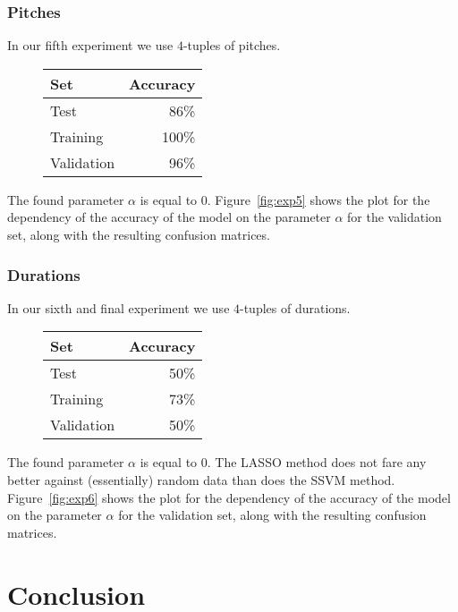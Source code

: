 \documentclass[twocolumn,dvipsnames]{article}
\begin{document}
\subsubsection{Pitches}
In our fifth experiment we use $4$-tuples of pitches.
\begin{figure}[H]
\centering
\begin{tabular}{lr}
\toprule
Set        & Accuracy  \\
\midrule
Test       &     86\%  \\
Training   &     100\% \\
Validation &     96\%  \\
\bottomrule
\end{tabular}
\end{figure}

The found parameter $\alpha$ is equal to $0$.
Figure~\ref{fig:exp5} shows the plot for the dependency of the accuracy of the model on the parameter $\alpha$ for the validation set,
along with the resulting confusion matrices.

\subsubsection{Durations}
In our sixth and final experiment we use $4$-tuples of durations.
\begin{figure}[H]
\centering
\begin{tabular}{lr}
\toprule
Set        & Accuracy \\
\midrule
Test       &     50\% \\
Training   &     73\% \\
Validation &     50\% \\
\bottomrule
\end{tabular}
\end{figure}

The found parameter $\alpha$ is equal to $0$.
The LASSO method does not fare any better against (essentially) random data than does the SSVM method.
Figure~\ref{fig:exp6} shows the plot for the dependency of the accuracy of the model on the parameter $\alpha$ for the validation set,
along with the resulting confusion matrices.

\section{Conclusion}
\end{document}

